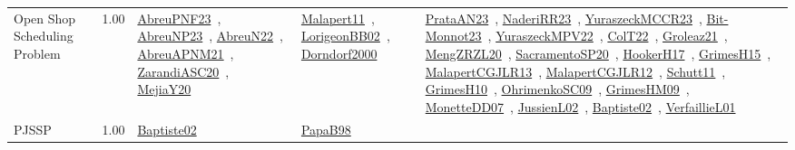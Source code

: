 {\begin{longtable}{p{3cm}r>{\raggedright\arraybackslash}p{6cm}>{\raggedright\arraybackslash}p{6cm}>{\raggedright\arraybackslash}p{8cm}}
\index{Open Shop Scheduling Problem}\index{Classification!Open Shop Scheduling Problem}Open Shop Scheduling Problem &  1.00 & \href{../works/AbreuPNF23.pdf}{AbreuPNF23}~\cite{AbreuPNF23}, \href{../works/AbreuNP23.pdf}{AbreuNP23}~\cite{AbreuNP23}, \href{../works/AbreuN22.pdf}{AbreuN22}~\cite{AbreuN22}, \href{../works/AbreuAPNM21.pdf}{AbreuAPNM21}~\cite{AbreuAPNM21}, \href{../works/ZarandiASC20.pdf}{ZarandiASC20}~\cite{ZarandiASC20}, \href{../works/MejiaY20.pdf}{MejiaY20}~\cite{MejiaY20} & \href{../works/Malapert11.pdf}{Malapert11}~\cite{Malapert11}, \href{../works/LorigeonBB02.pdf}{LorigeonBB02}~\cite{LorigeonBB02}, \href{../works/Dorndorf2000.pdf}{Dorndorf2000}~\cite{Dorndorf2000} & \href{../works/PrataAN23.pdf}{PrataAN23}~\cite{PrataAN23}, \href{../works/NaderiRR23.pdf}{NaderiRR23}~\cite{NaderiRR23}, \href{../works/YuraszeckMCCR23.pdf}{YuraszeckMCCR23}~\cite{YuraszeckMCCR23}, \href{../works/Bit-Monnot23.pdf}{Bit-Monnot23}~\cite{Bit-Monnot23}, \href{../works/YuraszeckMPV22.pdf}{YuraszeckMPV22}~\cite{YuraszeckMPV22}, \href{../works/ColT22.pdf}{ColT22}~\cite{ColT22}, \href{../works/Groleaz21.pdf}{Groleaz21}~\cite{Groleaz21}, \href{../works/MengZRZL20.pdf}{MengZRZL20}~\cite{MengZRZL20}, \href{../works/SacramentoSP20.pdf}{SacramentoSP20}~\cite{SacramentoSP20}, \href{../works/HookerH17.pdf}{HookerH17}~\cite{HookerH17}, \href{../works/GrimesH15.pdf}{GrimesH15}~\cite{GrimesH15}, \href{../works/MalapertCGJLR13.pdf}{MalapertCGJLR13}~\cite{MalapertCGJLR13}, \href{../works/MalapertCGJLR12.pdf}{MalapertCGJLR12}~\cite{MalapertCGJLR12}, \href{../works/Schutt11.pdf}{Schutt11}~\cite{Schutt11}, \href{../works/GrimesH10.pdf}{GrimesH10}~\cite{GrimesH10}, \href{../works/OhrimenkoSC09.pdf}{OhrimenkoSC09}~\cite{OhrimenkoSC09}, \href{../works/GrimesHM09.pdf}{GrimesHM09}~\cite{GrimesHM09}, \href{../works/MonetteDD07.pdf}{MonetteDD07}~\cite{MonetteDD07}, \href{../works/JussienL02.pdf}{JussienL02}~\cite{JussienL02}, \href{../works/Baptiste02.pdf}{Baptiste02}~\cite{Baptiste02}, \href{../works/VerfaillieL01.pdf}{VerfaillieL01}~\cite{VerfaillieL01}\\
\index{PJSSP}\index{Classification!PJSSP}PJSSP &  1.00 & \href{../works/Baptiste02.pdf}{Baptiste02}~\cite{Baptiste02} & \href{../works/PapaB98.pdf}{PapaB98}~\cite{PapaB98} & \\

\end{longtable}}
